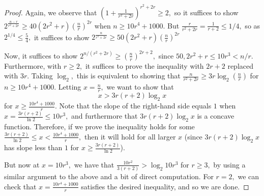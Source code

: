 \documentclass[10pt,a4paper]{amsart}
\begin{document}
\begin{proof}
\par Again, we observe that $\left(1 + \frac{1}{r^2 + 2r}\right)^{r^2 + 2r} \geq 2,$ so it suffices to show $2^{\frac{n-r}{r^2 + 2r}} \geq 40(2r^2 + r)\left(\frac{n}{r}\right)^{2r}$ when $n \geq 10r^4 + 1000.$ But $\frac{r}{r^2 + 2r} = \frac{1}{r+2} \leq 1/4,$ so as $2^{1/4} \leq \frac{5}{4},$ it suffices to show $2^{\frac{n}{r^2 + 2r}} \geq 50(2r^2 + r)\left(\frac{n}{r}\right)^{2r}$
\par Now, it suffices to show $2^{n/(r^2 + 2r)} \geq\left(\frac{n}{r}\right)^{2r + 2},$ since $50, 2r^2 + r \leq 10r^3 < n/r.$ Furthermore, with $r \geq 2,$ it suffices to prove the inequality with $2r + 2$ replaced with $3r.$ Taking $\log_2,$ this is equivalent to showing that $\frac{n}{r^2 + 2r} \geq 3r \log_2(\frac{n}{r})$ for $n \geq 10r^4 + 1000.$ Letting $x = \frac{n}{r},$ we want to show that $$x > 3r(r+2) \log_2x$$ for $x \geq \frac{10r^4 + 1000}{r}.$ Note that the slope of the right-hand side equals $1$ when $x = \frac{3r(r+2)}{\ln 2} \leq 10r^3,$ and furthermore that $3r(r+2) \log_2 x$ is a concave function. Therefore, if we prove the inequality holds for some $\frac{3r(r+2)}{\ln 2} \leq x < \frac{10r^4 + 1000}{r},$ then it will hold for all larger $x$ (since $3r(r+2) \log_2 x$ has slope less than $1$ for $x \geq \frac{3r(r+2)}{\ln 2}$). 
\par But now at $x = 10r^3,$ we have that $\frac{10r^2}{3(r+2)} > \log_2 10r^3$ for $r \geq 3,$ by using a similar argument to the above and a bit of direct computation. For $r = 2,$ we can check that $x = \frac{10r^4 + 1000}{r}$ satisfies the desired inequality, and so we are done.
\end{proof}
\end{document}
